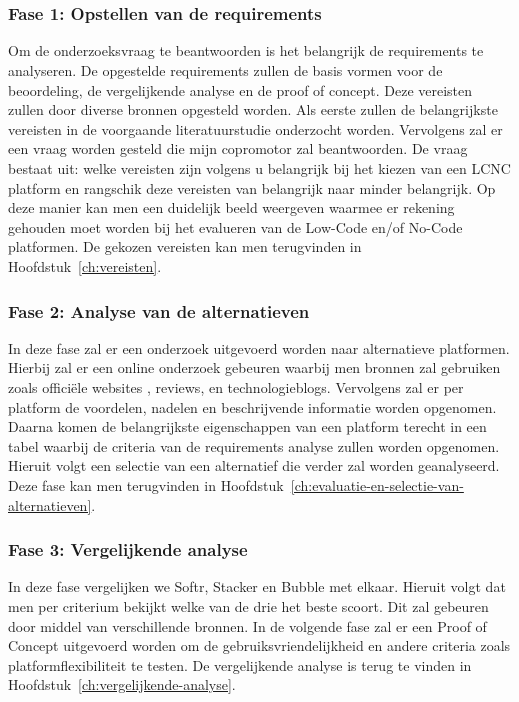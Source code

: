 
\chapter{}%
\label{ch:methodologie}

\subsection*{Fase 1: Opstellen van de requirements}%
\label{sec:opstellen-van-de-requirements}
Om de onderzoeksvraag te beantwoorden is het belangrijk 
de requirements te analyseren. De opgestelde requirements zullen de basis vormen voor de beoordeling, de vergelijkende analyse en de proof of concept.
Deze vereisten zullen door diverse bronnen opgesteld worden. Als eerste
zullen de belangrijkste vereisten in de voorgaande literatuurstudie onderzocht worden. Vervolgens zal er een vraag
worden gesteld die mijn copromotor zal beantwoorden. De vraag bestaat uit: welke vereisten zijn volgens u belangrijk bij het kiezen van een 
LCNC platform en rangschik deze vereisten van belangrijk naar minder belangrijk. Op deze manier kan men een duidelijk beeld weergeven waarmee er rekening gehouden moet worden 
bij het evalueren van de Low-Code en/of No-Code platformen. De gekozen vereisten kan men terugvinden in Hoofdstuk~\ref{ch:vereisten}.

\subsection*{Fase 2: Analyse van de alternatieven}%
\label{sec:analyse-van-de-alternatieven}
In deze fase zal er een onderzoek uitgevoerd worden naar alternatieve platformen.
Hierbij zal er een online onderzoek gebeuren waarbij men bronnen zal gebruiken zoals 
officiële websites , reviews, en technologieblogs. Vervolgens zal er per platform de 
voordelen, nadelen en beschrijvende informatie worden opgenomen. Daarna komen 
de belangrijkste eigenschappen van een platform terecht in een tabel waarbij de criteria
van de requirements analyse zullen worden opgenomen. Hieruit volgt een selectie van een 
alternatief die verder zal worden geanalyseerd. Deze fase kan men terugvinden in Hoofdstuk~\ref{ch:evaluatie-en-selectie-van-alternatieven}.


\subsection*{Fase 3: Vergelijkende analyse}%
\label{sec:vergelijkende-analyse}
In deze fase vergelijken we Softr, Stacker en Bubble met elkaar.
Hieruit volgt dat men per criterium bekijkt welke van de drie het beste scoort. Dit zal gebeuren door middel van verschillende bronnen.
In de volgende fase zal er een Proof of Concept uitgevoerd worden om de gebruiksvriendelijkheid en andere criteria zoals platformflexibiliteit te testen.
De vergelijkende analyse is terug te vinden in Hoofdstuk~\ref{ch:vergelijkende-analyse}.

